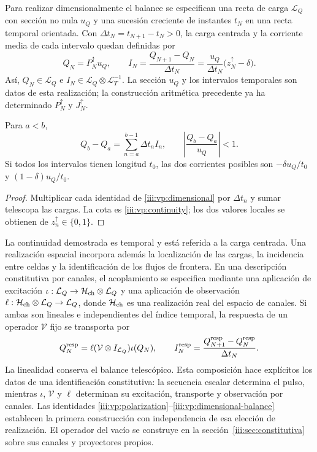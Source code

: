 Para realizar dimensionalmente el balance se especifican una recta de carga
$\mathcal L_Q$ con sección no nula $u_Q$ y una sucesión creciente de
instantes $t_N$ en una recta temporal orientada. Con
$\Delta t_N=t_{N+1}-t_N>0$, la carga centrada y la corriente media de
cada intervalo quedan definidas por
\begin{equation}
 Q_N=P_N^{\uparrow}u_Q,\qquad
 I_N=\frac{Q_{N+1}-Q_N}{\Delta t_N}
     =\frac{u_Q}{\Delta t_N}\bigl(z_N^{\uparrow}-\delta\bigr).
 \label{iii:vp:dimensional}
\end{equation}
Así, $Q_N\in\mathcal L_Q$ e
$I_N\in\mathcal L_Q\otimes\mathcal L_T^{-1}$. La sección $u_Q$ y
los intervalos temporales son datos de esta realización; la construcción
aritmética precedente ya ha determinado $P_N^{\uparrow}$ y
$J_N^{\uparrow}$.

\begin{proposition}
Para $a<b$,
\begin{equation}
 Q_b-Q_a=\sum_{n=a}^{b-1}\Delta t_n I_n,
 \qquad
 \left|\frac{Q_b-Q_a}{u_Q}\right|<1.
 \label{iii:vp:dimensional-balance}
\end{equation}
Si todos los intervalos tienen longitud $t_0$, las dos corrientes posibles
son $-\delta u_Q/t_0$ y $(1-\delta)u_Q/t_0$.
\end{proposition}
\begin{proof}
Multiplicar cada identidad de \eqref{iii:vp:dimensional} por
$\Delta t_n$ y sumar telescopa las cargas. La cota es
\eqref{iii:vp:continuity}; los dos valores locales se obtienen de
$z_n^{\uparrow}\in\{0,1\}$.
\end{proof}

La continuidad demostrada es temporal y está referida a la carga centrada.
Una realización espacial incorpora además la localización de las cargas,
la incidencia entre celdas y la identificación de los flujos de frontera.
En una descripción constitutiva por canales, el acoplamiento se especifica
mediante una aplicación de excitación
$\iota:\mathcal L_Q\to\mathcal H_{\rm ch}\otimes\mathcal L_Q$
y una aplicación de observación
$\ell:\mathcal H_{\rm ch}\otimes\mathcal L_Q\to\mathcal L_Q$,
donde $\mathcal H_{\rm ch}$ es una realización real del espacio de canales.
Si ambas son
lineales e independientes del índice temporal, la respuesta de un operador
$\mathcal V$ fijo se transporta por
\[
 Q_N^{\rm resp}=\ell(\mathcal V\otimes I_{\mathcal L_Q})\iota(Q_N),
 \qquad
 I_N^{\rm resp}=\frac{Q_{N+1}^{\rm resp}-Q_N^{\rm resp}}{\Delta t_N}.
\]
La linealidad conserva el balance telescópico. Esta composición hace
explícitos los datos de una identificación constitutiva: la secuencia
escalar determina el pulso, mientras $\iota$, $\mathcal V$ y $\ell$
determinan su excitación, transporte y observación por canales. Las
identidades \eqref{iii:vp:polarization}--\eqref{iii:vp:dimensional-balance}
establecen la primera construcción con independencia de esa elección de
realización. El operador del vacío se construye en la
sección~\ref{iii:sec:constitutiva} sobre sus canales y proyectores propios.

